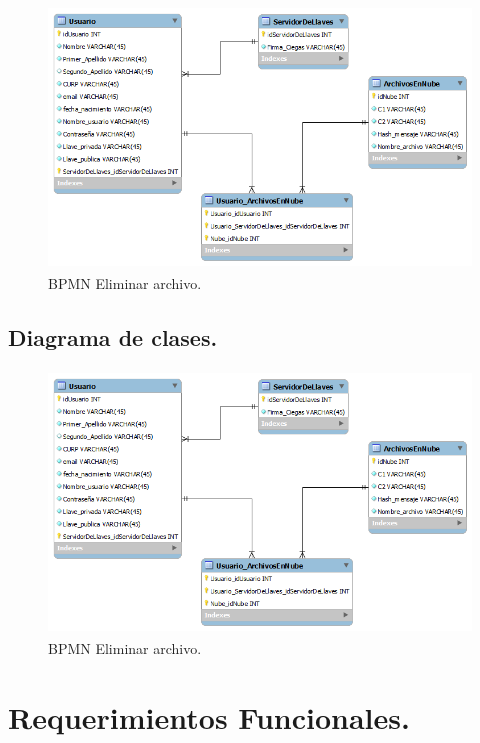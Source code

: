 \begin{figure}[H]
\centering
	\includegraphics[width=16cm, height=7cm]{./images/BDTT2.png}
	\caption{BPMN Eliminar archivo.}

\end{figure} 

\newpage

\subsection{Diagrama de clases. }

\begin{figure}[H]
\centering
	\includegraphics[width=16cm, height=7cm]{./images/BDTT2.png}
	\caption{BPMN Eliminar archivo.}

\end{figure} 
\section{Requerimientos Funcionales. }

